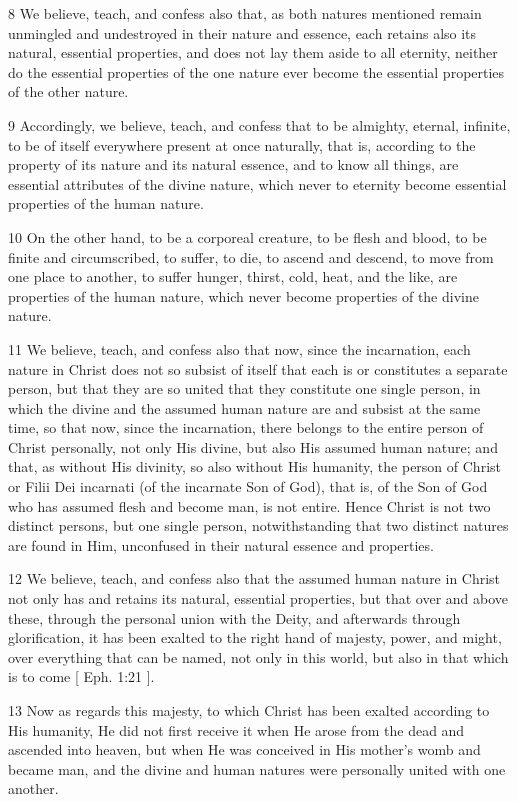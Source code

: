 8 We believe, teach, and confess also that, as both natures mentioned remain unmingled and undestroyed in their nature and essence, each retains also its natural, essential properties, and does not lay them aside to all eternity, neither do the essential properties of the one nature ever become the essential properties of the other nature.

9 Accordingly, we believe, teach, and confess that to be almighty, eternal, infinite, to be of itself everywhere present at once naturally, that is, according to the property of its nature and its natural essence, and to know all things, are essential attributes of the divine nature, which never to eternity become essential properties of the human nature.

10 On the other hand, to be a corporeal creature, to be flesh and blood, to be finite and circumscribed, to suffer, to die, to ascend and descend, to move from one place to another, to suffer hunger, thirst, cold, heat, and the like, are properties of the human nature, which never become properties of the divine nature.

11 We believe, teach, and confess also that now, since the incarnation, each nature in Christ does not so subsist of itself that each is or constitutes a separate person, but that they are so united that they constitute one single person, in which the divine and the assumed human nature are and subsist at the same time, so that now, since the incarnation, there belongs to the entire person of Christ personally, not only His divine, but also His assumed human nature; and that, as without His divinity, so also without His humanity, the person of Christ or Filii Dei incarnati (of the incarnate Son of God), that is, of the Son of God who has assumed flesh and become man, is not entire. Hence Christ is not two distinct persons, but one single person, notwithstanding that two distinct natures are found in Him, unconfused in their natural essence and properties.

12 We believe, teach, and confess also that the assumed human nature in Christ not only has and retains its natural, essential properties, but that over and above these, through the personal union with the Deity, and afterwards through glorification, it has been exalted to the right hand of majesty, power, and might, over everything that can be named, not only in this world, but also in that which is to come [ Eph. 1:21 ].

13 Now as regards this majesty, to which Christ has been exalted according to His humanity, He did not first receive it when He arose from the dead and ascended into heaven, but when He was conceived in His mother’s womb and became man, and the divine and human natures were personally united with one another.

